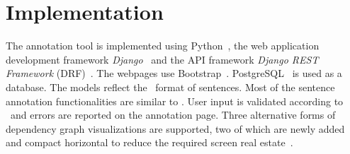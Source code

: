 \section{Implementation}
\label{sec:implementation}

The annotation tool is implemented using  Python~\cite{python}, the web application development framework \textit{Django}~\cite{django} and the API framework \textit{Django REST Framework} (DRF)~\cite{drf}. The webpages use Bootstrap~\cite{bootstrap}.
PostgreSQL~\cite{psql} is used as a database.
The models reflect the \ud\ format of sentences.
Most of the sentence annotation functionalities are similar to \boatvone.
User input is validated according to  \ud\ and errors are reported on the annotation page.
Three alternative forms of dependency graph visualizations are supported, two of which are newly added and compact horizontal to reduce the required screen real estate~\cite{spacy,spyssalo}.

